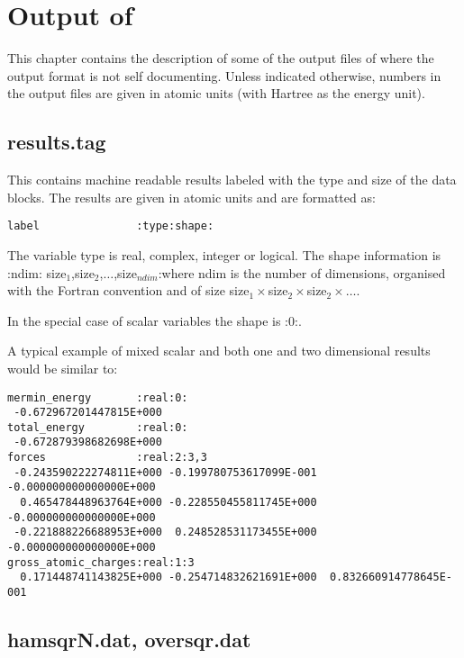 \chapter{Output of \dftbp}
\label{sec:dftbp.output}

This chapter contains the description of some of the output files of
\dftbp{} where the output format is not self documenting. Unless
indicated otherwise, numbers in the output files are given in atomic
units (with Hartree as the energy unit).

\section{results.tag}
\label{sec:dftbp.results}

This contains machine readable results labeled with the type and size of the
data blocks. The results are given in atomic units and are formatted as:
\begin{verbatim}
label               :type:shape:
\end{verbatim}

The variable type is real, complex, integer or logical. The shape information is
\newline :ndim: size$_1$,size$_2$,$\ldots$,size$_{ndim}$:\newline where ndim is
the number of dimensions, organised with the Fortran convention and of size
size$_1 \times$size$_2 \times$size$_2 \times \ldots$.

In the special case of scalar variables the shape is :0:.

A typical example of mixed scalar and both one and two dimensional results would
be similar to:
\begin{verbatim}
mermin_energy       :real:0:
 -0.672967201447815E+000
total_energy        :real:0:
 -0.672879398682698E+000
forces              :real:2:3,3
 -0.243590222274811E+000 -0.199780753617099E-001 -0.000000000000000E+000
  0.465478448963764E+000 -0.228550455811745E+000 -0.000000000000000E+000
 -0.221888226688953E+000  0.248528531173455E+000 -0.000000000000000E+000
gross_atomic_charges:real:1:3
  0.171448741143825E+000 -0.254714832621691E+000  0.832660914778645E-001
\end{verbatim}

\section{hamsqrN.dat, oversqr.dat}
\label{sec:dftbp.hamsqr}

